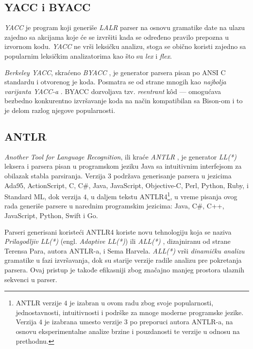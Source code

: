 \subsection{YACC i BYACC}
\label{subsec:BYACC}
\emph{YACC} \cite{LexYacc} je program koji generiše \emph{LALR} \cite{LALR1} parser na osnovu gramatike date na ulazu zajedno sa akcijama koje će se izvršiti kada se određeno pravilo prepozna u izvornom kodu. \emph{YACC} ne vrši leksičku analizu, stoga se obično koristi zajedno sa popularnim leksičkim analizatorima kao što su \emph{lex} i \emph{flex}. 

\emph{Berkeley YACC}, skraćeno \emph{BYACC} \cite{BYACC}, je generator parsera pisan po ANSI C standardu i otvorenog je koda. Posmatra se od strane mnogih kao \textit{najbolja varijanta YACC-a} \cite{LexYacc}. BYACC dozvoljava tzv. \emph{reentrant} k\^od --- omogućava bezbedno konkurentno izvršavanje koda na način kompatibilan sa Bison-om i to je delom razlog njegove popularnosti.

\subsection{ANTLR}
\label{subsec:ANTLR}
\emph{Another Tool for Language Recognition}, ili kraće \emph{ANTLR} \cite{ANTLR}, je generator \emph{LL(*)} \cite{LLStar} leksera i parsera pisan u programskom jeziku Java sa intuitivnim interfejsom za obilazak stabla parsiranja. Verzija $3$ podržava generisanje parsera u jezicima Ada95, ActionScript, C, C\#, Java, JavaScript, Objective-C, Perl, Python, Ruby, i Standard ML, dok verzija $4$, u daljem tekstu ANTLR4\footnote{ANTLR verzije $4$ je izabran u ovom radu zbog svoje popularnosti, jednostavnosti, intuitivnosti i podrške za mnoge moderne programske jezike. Verzija $4$ je izabrana umesto verzije $3$ po preporuci autora ANTLR-a, na osnovu eksperimentalne analize brzine i pouzdanosti te verzije u odnosu na prethodnu.}, u vreme pisanja ovog rada generiše parsere u narednim programskim jezicima: Java, C\#, C++, JavaScript, Python, Swift i Go.

Parseri generisani koristeći ANTLR4 koriste novu tehnologiju koja se naziva \emph{Prilagodljiv LL(*)} (engl. \emph{Adaptive LL(*)}) ili \emph{ALL(*)} \cite{ANTLRReference}, dizajniranu od strane Terensa Para, autora ANTLR-a, i Sema Harvela. \emph{ALL(*)} vrši \emph{dinamičku analizu} gramatike u fazi izvršavanja, dok su starije verzije radile analizu pre pokretanja parsera. Ovaj pristup je takođe efikasniji zbog značajno manjeg prostora ulaznih sekvenci u parser.


